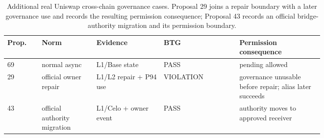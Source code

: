 \begin{table}[t]\centering\scriptsize
\caption{Additional real Uniswap cross-chain governance cases. Proposal 29 joins a repair boundary with a later governance use and records the resulting permission consequence; Proposal 43 records an official bridge-authority migration and its permission boundary.}
\label{tab:additional-crosschain}
\begin{tabular}{@{}p{0.08\linewidth}p{0.13\linewidth}p{0.16\linewidth}p{0.18\linewidth}p{0.20\linewidth}@{}}\toprule
Prop. & Norm & Evidence & BTG & Permission consequence \\ \midrule
69 & normal async & L1/Base state & PASS & pending allowed \\
29 & official owner repair & L1/L2 repair + P94 use & VIOLATION & governance unusable before repair; alias later succeeds \\
43 & official authority migration & L1/Celo + owner event & PASS & authority moves to approved receiver \\
\bottomrule
\end{tabular}
\end{table}
